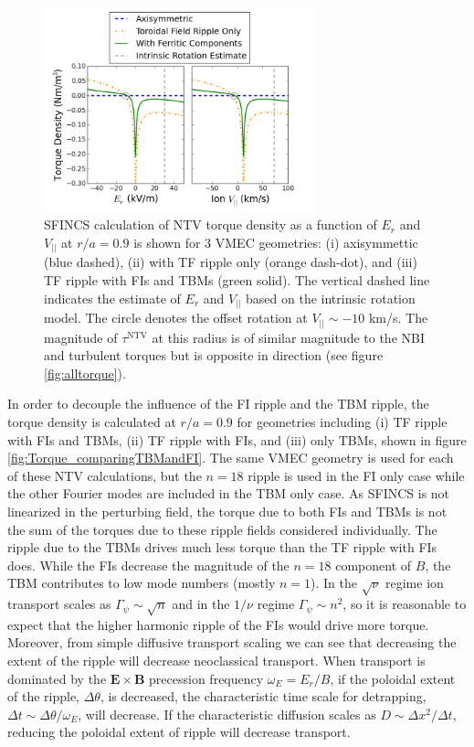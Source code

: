 \documentclass[aip, pop, preprint]{revtex4-1}
\numberwithin{figure}{section}
\numberwithin{equation}{section}
\begin{document}
\begin{figure}[h!]
\centering
\includegraphics[width=0.7\textwidth]{Torque_ErandV.png}
\caption{\label{fig:Torque_ErandV} SFINCS calculation of NTV torque density as a function of $E_r$ and $V_{||}$ at $r/a = 0.9$ is shown for 3 VMEC geometries: (i) axisymmettic (blue dashed), (ii) with TF ripple only (orange dash-dot), and (iii) TF ripple with FIs and TBMs (green solid). The vertical dashed line indicates the estimate of $E_r$ and $V_{||}$ based on the intrinsic rotation model. The circle denotes the offset rotation at $V_{||} \sim -10$ km/s. The magnitude of $\tau^{\text{NTV}}$ at this radius is of similar magnitude to the NBI and turbulent torques but is opposite in direction (see figure \ref{fig:alltorque}).}
\end{figure}

In order to decouple the influence of the FI ripple and the TBM ripple, the torque density is calculated at $r/a = 0.9$ for geometries including (i) TF ripple with FIs and TBMs, (ii) TF ripple with FIs, and (iii) only TBMs, shown in figure \ref{fig:Torque_comparingTBMandFI}. The same VMEC geometry is used for each of these NTV calculations, but the $n =18$ ripple is used in the FI only case while the other Fourier modes are included in the TBM only case. As SFINCS is not linearized in the perturbing field, the torque due to both FIs and TBMs is not the sum of the torques due to these ripple fields considered individually. The ripple due to the TBMs drives much less torque than the TF ripple with FIs does.  While the FIs decrease the magnitude of the $n =18$ component of $B$, the TBM contributes to low mode numbers (mostly $n = 1$). In the $\sqrt{\nu}$ regime ion transport scales as $\Gamma_{\psi} \sim \sqrt{n}$ and in the $1/\nu$ regime $\Gamma_{\psi} \sim n^2$,\cite{Shaing2010} so it is reasonable to expect that the higher harmonic ripple of the FIs would drive more torque. Moreover, from simple diffusive transport scaling we can see that decreasing the extent of the ripple will decrease neoclassical transport. When transport is dominated by the $\bm{E} \times \bm{B}$ precession frequency $\omega_E = E_r/B$, if the poloidal extent of the ripple, $\Delta \theta$, is decreased, the characteristic time scale for detrapping, $\Delta t \sim \Delta \theta/ \omega_E$, will decrease. If the characteristic diffusion scales as $D \sim \Delta x^2/\Delta t$, reducing the poloidal extent of ripple will decrease transport. 
\end{document}
